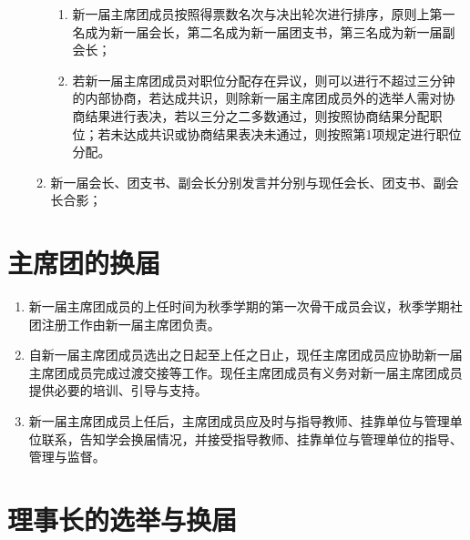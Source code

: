 \begin{enumerate}
\begin{enumerate}
        \begin{enumerate}
            \item 新一届主席团成员按照得票数名次与决出轮次进行排序，原则上第一名成为新一届会长，第二名成为新一届团支书，第三名成为新一届副会长；
            \item 若新一届主席团成员对职位分配存在异议，则可以进行不超过三分钟的内部协商，若达成共识，则除新一届主席团成员外的选举人需对协商结果进行表决，若以三分之二多数通过，则按照协商结果分配职位；若未达成共识或协商结果表决未通过，则按照第1项规定进行职位分配。
        \end{enumerate}

        \item 新一届会长、团支书、副会长分别发言并分别与现任会长、团支书、副会长合影；
    \end{enumerate}

\end{enumerate}

\section{主席团的换届}

\begin{enumerate}[resume]
    \item 新一届主席团成员的上任时间为秋季学期的第一次骨干成员会议，秋季学期社团注册工作由新一届主席团负责。
    
    \item 自新一届主席团成员选出之日起至上任之日止，现任主席团成员应协助新一届主席团成员完成过渡交接等工作。现任主席团成员有义务对新一届主席团成员提供必要的培训、引导与支持。
    
    \item 新一届主席团成员上任后，主席团成员应及时与指导教师、挂靠单位与管理单位联系，告知学会换届情况，并接受指导教师、挂靠单位与管理单位的指导、管理与监督。
\end{enumerate}

\section{理事长的选举与换届}

